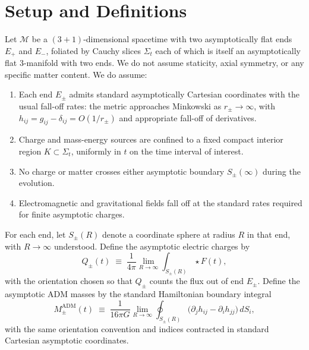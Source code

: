 \documentclass[aps,prd,onecolumn,nofootinbib,superscriptaddress]{revtex4-2}
\begin{document}
\section{Setup and Definitions}
\label{sec:setup}

Let $\mathcal{M}$ be a $(3+1)$-dimensional spacetime with two asymptotically flat ends $E_+$ and $E_-$, foliated by Cauchy slices $\Sigma_t$ each of which is itself an asymptotically flat 3-manifold with two ends. We do not assume staticity, axial symmetry, or any specific matter content. We do assume:

\begin{enumerate}
    \item Each end $E_\pm$ admits standard asymptotically Cartesian coordinates with the usual fall-off rates: the metric approaches Minkowski as $r_\pm \to \infty$, with $h_{ij} = g_{ij} - \delta_{ij} = O(1/r_\pm)$ and appropriate fall-off of derivatives.\cite{ArnowittDeserMisner1962Dynamics,ReggeTeitelboim1974SurfaceIntegrals}
    \item Charge and mass-energy sources are confined to a fixed compact interior region $K \subset \Sigma_t$, uniformly in $t$ on the time interval of interest.
    \item No charge or matter crosses either asymptotic boundary $S_\pm(\infty)$ during the evolution.
    \item Electromagnetic and gravitational fields fall off at the standard rates required for finite asymptotic charges.
\end{enumerate}

For each end, let $S_\pm(R)$ denote a coordinate sphere at radius $R$ in that end, with $R \to \infty$ understood. Define the asymptotic electric charges by
\begin{equation}
\label{eq:Qpm-def}
Q_\pm(t) \;\equiv\; \frac{1}{4\pi}\lim_{R\to\infty}\int_{S_\pm(R)} \star F(t),
\end{equation}
with the orientation chosen so that $Q_\pm$ counts the flux out of end $E_\pm$. Define the asymptotic ADM masses by the standard Hamiltonian boundary integral
\begin{equation}
\label{eq:Mpm-def}
M_\pm^{\mathrm{ADM}}(t) \;\equiv\; \frac{1}{16\pi G}\lim_{R\to\infty}\oint_{S_\pm(R)} \big(\partial_j h_{ij} - \partial_i h_{jj}\big)\,dS_i,
\end{equation}
with the same orientation convention and indices contracted in standard Cartesian asymptotic coordinates.\cite{ArnowittDeserMisner1962Dynamics,ReggeTeitelboim1974SurfaceIntegrals}
\end{document}
